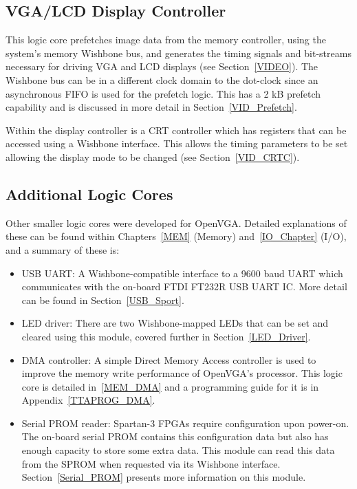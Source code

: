 \subsection{VGA/LCD Display Controller}
This logic core prefetches image data from the memory controller, using the
system's memory Wishbone bus, and generates the timing signals and bit-streams
necessary for driving VGA and LCD displays (see Section~\ref{VIDEO}). The
Wishbone bus can be in a different clock domain to the dot-clock since an
asynchronous FIFO is used for the prefetch logic. This has a 2 kB prefetch
capability and is discussed in more detail in Section~\ref{VID_Prefetch}.

Within the display controller is a CRT controller which has registers that can be
accessed using a Wishbone interface. This allows the timing parameters to be set
allowing the display mode to be changed (see Section~\ref{VID_CRTC}).


\subsection{Additional Logic Cores}
Other smaller logic cores were developed for OpenVGA. Detailed explanations of
these can be found within Chapters~\ref{MEM} (Memory) and~\ref{IO_Chapter}
(I/O), and a summary of these is:

\begin{itemize}
  \item USB UART: A Wishbone-compatible interface to a 9600 baud UART which
  communicates with the on-board FTDI FT232R USB UART IC. More detail can be
  found in Section~\ref{USB_Sport}.
  \item LED driver: There are two Wishbone-mapped LEDs that can be set and
  cleared using this module, covered further in Section~\ref{LED_Driver}.
  \item DMA controller: A simple Direct Memory Access controller is used to
  improve the memory write performance of OpenVGA's processor. This logic core
  is detailed in~\ref{MEM_DMA} and a programming guide for it is in
  Appendix~\ref{TTAPROG_DMA}.
  \item Serial PROM reader: Spartan-3 FPGAs require configuration upon
  power-on. The on-board serial PROM contains this configuration data but also
  has enough capacity to store some extra data. This module can read this data
  from the SPROM when requested via its Wishbone interface.
  Section~\ref{Serial_PROM} presents more information on this module.
\end{itemize}

